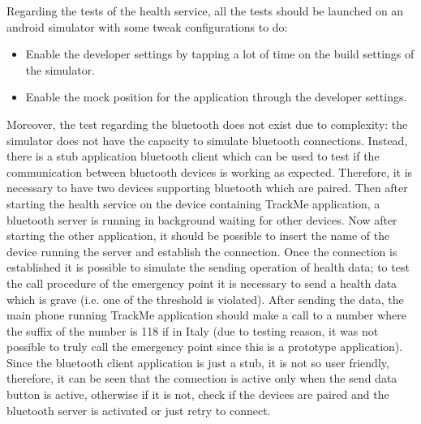 Regarding the tests of the health service, all the tests should be launched on an android simulator with some tweak configurations to do:
\begin{itemize}
\item Enable the developer settings by tapping a lot of time on the build settings of the simulator.
\item Enable the mock position for the application through the developer settings.
\end{itemize}
Moreover, the test regarding the bluetooth does not exist due to complexity: the simulator does not have the capacity to simulate bluetooth connections. Instead, there is a stub application bluetooth client which can be used to test if the communication between bluetooth devices is working as expected. Therefore, it is necessary to have two devices supporting bluetooth which are paired. Then after starting the health service on the device containing TrackMe application, a bluetooth server is running in background waiting for other devices. Now after starting the other application, it should be possible to insert the name of the device running the server and establish the connection. Once the connection is established it is possible to simulate the sending operation of health data; to test the call procedure of the emergency point it is necessary to send a health data which is grave (i.e. one of the threshold is violated). After sending the data, the main phone running TrackMe application should make a call to a number where the suffix of the number is 118 if in Italy (due to testing reason, it was not possible to truly call the emergency point since this is a prototype application).
Since the bluetooth client application is just a stub, it is not so user friendly, therefore, it can be seen that the connection is active only when the send data button is active, otherwise if it is not, check if the devices are paired and the bluetooth server is activated or just retry to connect.



